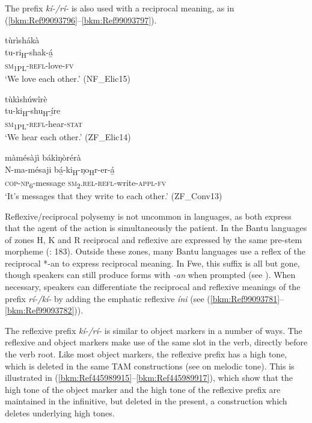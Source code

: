 The prefix \textit{kí-/rí-} is also used with a reciprocal meaning, as in (\ref{bkm:Ref99093796}--\ref{bkm:Ref99093797}).

\ea
\label{bkm:Ref99093796}
\glll tùrìshákà\\
tu-ri\textsubscript{H}-shak-á̲\\
\textsc{sm}\textsubscript{1PL}-\textsc{refl}-love-\textsc{fv}\\
\glt ‘We love each other.’ (NF\_Elic15)
\z

\ea
\glll tùkìshúwîrè\\
tu-ki\textsubscript{H}-shu\textsubscript{H}-í̲re\\
\textsc{sm}\textsubscript{1PL}-\textsc{refl}-hear-\textsc{stat}\\
\glt ‘We hear each other.’ (ZF\_Elic14)
\z

\ea
\label{bkm:Ref99093797}
màmésàjì bákìŋòrérà\\
\gll N-ma-mésaji  bá̲-ki\textsubscript{H}-ŋo\textsubscript{H}r-er-á̲\\
\textsc{cop}-\textsc{np}\textsubscript{6}-message  \textsc{sm}\textsubscript{2}.\textsc{rel}-\textsc{refl}-write-\textsc{appl}-\textsc{fv}\\
\glt ‘It’s messages that they write to each other.’ (ZF\_Conv13)
\z

Reflexive/reciprocal polysemy is not uncommon in languages, as both express that the agent of the action is simultaneously the patient. In the Bantu languages of zones H, K and R reciprocal and reflexive are expressed by the same pre-stem morpheme (\citealt{SchadebergBostoen2019}: 183). Outside these zones, many Bantu languages use a reflex of the reciprocal *-an to express reciprocal meaning. In Fwe, this suffix is all but gone, though speakers can still produce forms with \textit{\nobreakdash-an} when prompted (see ). When necessary, speakers can differentiate the reciprocal and reflexive meanings of the prefix \textit{rí-/kí-} by adding the emphatic reflexive \textit{\-íni} (see (\ref{bkm:Ref99093781}--\ref{bkm:Ref99093782})).

The reflexive prefix \textit{kí-/rí-} is similar to object markers in a number of ways. The reflexive and object markers make use of the same slot in the verb, directly before the verb root. Like most object markers, the reflexive prefix has a high tone, which is deleted in the same TAM constructions (see  on melodic tone). This is illustrated in (\ref{bkm:Ref445989915}--\ref{bkm:Ref445989917}), which show that the high tone of the object marker and the high tone of the reflexive prefix are maintained in the infinitive, but deleted in the present, a construction which deletes underlying high tones.

